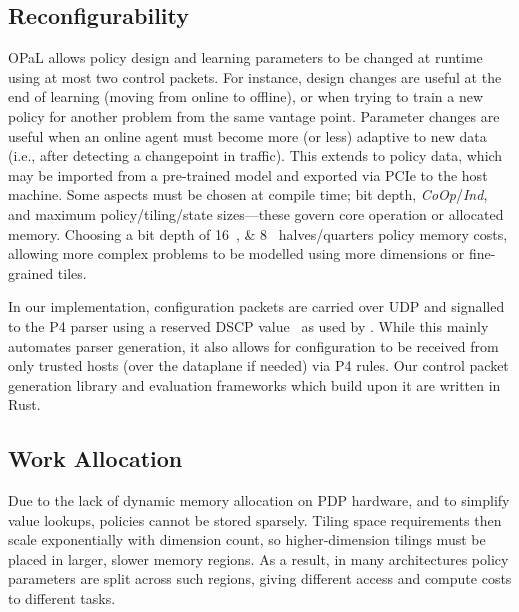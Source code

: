 \documentclass[
sigconf,natbib=false
,anonymous=true
,10pt
]{acmart}
\newcommand{\approachshort}{OPaL}
\newcommand{\Coopfw}{\emph{CoOp}}
\newcommand{\Indfw}{\emph{Ind}}
\begin{document}
\subsection{Reconfigurability}
\approachshort{} allows policy design and learning parameters to be changed at runtime using at most two control packets.
For instance, design changes are useful at the end of learning (moving from online to offline), or when trying to train a new policy for another problem from the same vantage point.
Parameter changes are useful when an online agent must become more (or less) adaptive to new data (i.e., after detecting a changepoint in traffic).
This extends to policy data, which may be imported from a pre-trained model and exported via PCIe to the host machine.
Some aspects must be chosen at compile time; bit depth, \Coopfw/\Indfw, and maximum policy/tiling/state sizes---these govern core operation or allocated memory.
Choosing a bit depth of \qtylist[list-pair-separator = { or }]{16;8}{\bit} halves/quarters policy memory costs, allowing more complex problems to be modelled using more dimensions or fine-grained tiles.

In our implementation, configuration packets are carried over UDP and signalled to the P4 parser using a reserved DSCP value~\parencite{rfc2474} as used by \textcite{DBLP:conf/isca/LiLYCSH19}.
While this mainly automates parser generation, it also allows for configuration to be received from only trusted hosts (over the dataplane if needed) via P4 rules.
Our control packet generation library and evaluation frameworks which build upon it are written in Rust.


\subsection{Work Allocation}\label{sec:work-allocation}
Due to the lack of dynamic memory allocation on PDP hardware, and to simplify value lookups, policies cannot be stored sparsely.
Tiling space requirements then scale exponentially with dimension count, so higher-dimension tilings must be placed in larger, slower memory regions.
As a result, in many architectures policy parameters are split across such regions, giving different access and compute costs to different tasks.
\end{document}
